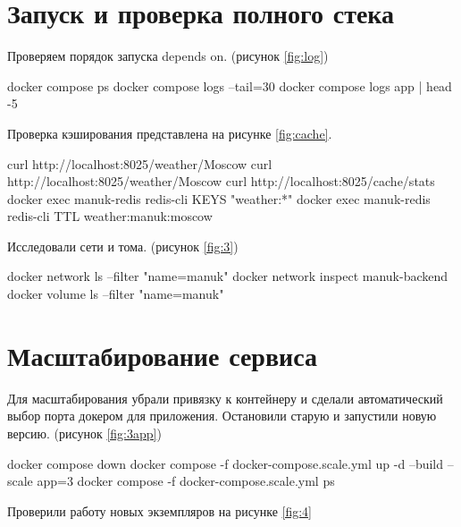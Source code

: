 \section{Запуск и проверка полного стека}

Проверяем порядок запуска depends on. (рисунок \ref{fig:log})

\begin{code}
docker compose ps
docker compose logs --tail=30
docker compose logs app | head -5
\end{code}


Проверка кэширования представлена на рисунке \ref{fig:cache}.

\begin{code}
curl http://localhost:8025/weather/Moscow
curl http://localhost:8025/weather/Moscow
curl http://localhost:8025/cache/stats
docker exec manuk-redis redis-cli KEYS "weather:*"
docker exec manuk-redis redis-cli TTL weather:manuk:moscow
\end{code}


Исследовали сети и тома. (рисунок \ref{fig:3})

\begin{code}
docker network ls --filter "name=manuk"
docker network inspect manuk-backend
docker volume ls --filter "name=manuk"
\end{code}


\section{Масштабирование сервиса}

Для масштабирования убрали привязку к контейнеру и сделали автоматический выбор порта докером для приложения. Остановили старую и запустили новую версию. (рисунок \ref{fig:3app})

\begin{code}
docker compose down
docker compose -f docker-compose.scale.yml up -d --build --scale app=3
docker compose -f docker-compose.scale.yml ps
\end{code}


Проверили работу новых экземпляров на рисунке \ref{fig:4}

